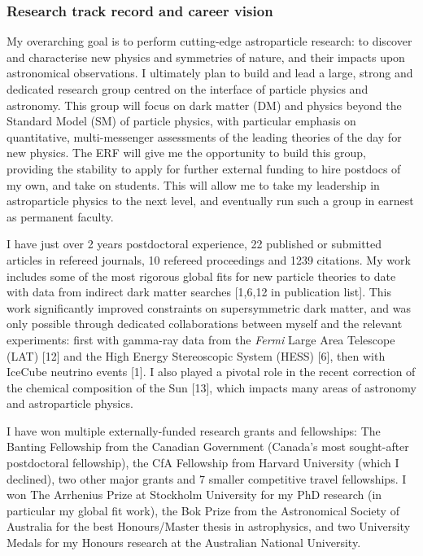 \documentclass[11pt,oneside,twocolumn,a4paper]{article}
\author{Pat Scott}
\date{}
\begin{document}
\thispagestyle{fancy}

\subsubsection*{Research track record and career vision}

My overarching goal is to perform cutting-edge astroparticle research: to discover and characterise new physics and symmetries of nature, and their impacts upon astronomical observations. I ultimately plan to build and lead a large, strong and dedicated research group centred on the interface of particle physics and astronomy. This group will focus on dark matter (DM) and physics beyond the Standard Model (SM) of particle physics, with particular emphasis on quantitative, multi-messenger assessments of the leading theories of the day for new physics.  The ERF will give me the opportunity to build this group, providing the stability to apply for further external funding to hire postdocs of my own, and take on students. This will allow me to take my leadership in astroparticle physics to the next level, and eventually run such a group in earnest as permanent faculty.

I have just over 2 years postdoctoral experience, 22 published or submitted articles in refereed journals, 10 refereed proceedings and 1239 citations.  My work includes some of the most rigorous global fits for new particle theories to date with data from indirect dark matter searches [1,6,12 in publication list].  This work significantly improved constraints on supersymmetric dark matter, and was only possible through dedicated collaborations between myself and the relevant experiments: first with gamma-ray data from the \emph{Fermi} Large Area Telescope (LAT) [12] and the High Energy Stereoscopic System (HESS) [6], then with IceCube neutrino events [1].  I also played a pivotal role in the recent correction of the chemical composition of the Sun [13], which impacts many areas of astronomy and astroparticle physics.

I have won multiple externally-funded research grants and fellowships: The Banting Fellowship from the Canadian Government (Canada's most sought-after postdoctoral fellowship), the CfA Fellowship from Harvard University (which I declined), two other major grants and 7 smaller competitive travel fellowships. I won The Arrhenius Prize at Stockholm University for my PhD research (in particular my global fit work), the Bok Prize from the Astronomical Society of Australia for the best Honours/Master thesis in astrophysics, and two University Medals for my Honours research at the Australian National University.
\end{document}
